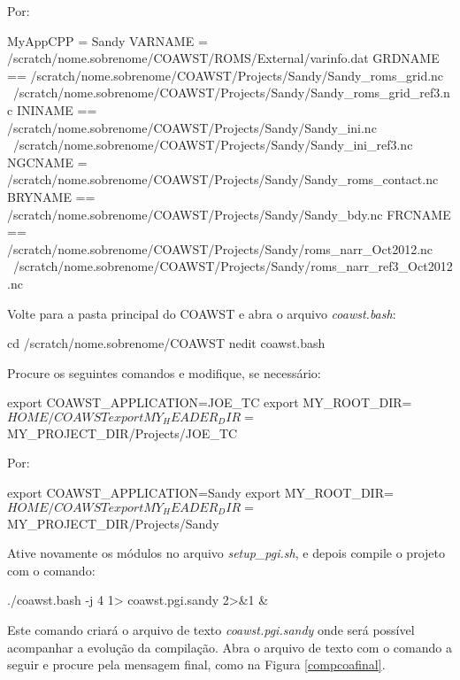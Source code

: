 \noindent Por:
\bigskip

\begin{bashcode}[fontsize=\footnotesize]
MyAppCPP = Sandy
VARNAME  = /scratch/nome.sobrenome/COAWST/ROMS/External/varinfo.dat
GRDNAME == /scratch/nome.sobrenome/COAWST/Projects/Sandy/Sandy_roms_grid.nc \
           /scratch/nome.sobrenome/COAWST/Projects/Sandy/Sandy_roms_grid_ref3.nc
ININAME == /scratch/nome.sobrenome/COAWST/Projects/Sandy/Sandy_ini.nc \
           /scratch/nome.sobrenome/COAWST/Projects/Sandy/Sandy_ini_ref3.nc
NGCNAME =  /scratch/nome.sobrenome/COAWST/Projects/Sandy/Sandy_roms_contact.nc
BRYNAME == /scratch/nome.sobrenome/COAWST/Projects/Sandy/Sandy_bdy.nc
FRCNAME == /scratch/nome.sobrenome/COAWST/Projects/Sandy/roms_narr_Oct2012.nc \
           /scratch/nome.sobrenome/COAWST/Projects/Sandy/roms_narr_ref3_Oct2012.nc
\end{bashcode}
\bigskip

\noindent Volte para a pasta principal do COAWST e abra o arquivo \textit{coawst.bash}:
\bigskip

\begin{bashcode}
cd /scratch/nome.sobrenome/COAWST
nedit coawst.bash
\end{bashcode}
\bigskip

\noindent Procure os seguintes comandos e modifique, se necessário:
\bigskip

\begin{bashcode}
export   COAWST_APPLICATION=JOE_TC
export   MY_ROOT_DIR=${HOME}/COAWST
export   MY_HEADER_DIR=${MY_PROJECT_DIR}/Projects/JOE_TC
\end{bashcode}
\bigskip

\noindent Por:
\bigskip

\begin{bashcode}
export   COAWST_APPLICATION=Sandy
export   MY_ROOT_DIR=${HOME}/COAWST
export   MY_HEADER_DIR=${MY_PROJECT_DIR}/Projects/Sandy
\end{bashcode}
\bigskip

\noindent Ative novamente os módulos no arquivo \textit{setup\_pgi.sh}, e depois compile o projeto com o comando:
\bigskip

\begin{bashcode}
./coawst.bash -j 4  1> coawst.pgi.sandy 2>&1 &
\end{bashcode}
\bigskip

\noindent Este comando criará o arquivo de texto \textit{coawst.pgi.sandy} onde será possível acompanhar a evolução da compilação. Abra o arquivo de texto com o comando a seguir e procure pela mensagem final, como na Figura \textcolor{bleu_cite}{\ref{compcoafinal}}.
\bigskip

